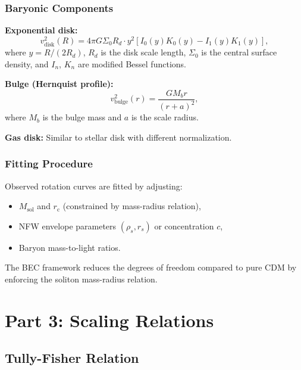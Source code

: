 \documentclass[11pt,a4paper]{article}
\newcommand{\Msol}{\ensuremath{M_{\mathrm{sol}}}}
\newcommand{\rc}{\ensuremath{r_{\mathrm{c}}}}
\theoremstyle{definition}
\theoremstyle{remark}
\begin{document}
\subsubsection{Baryonic Components}

\textbf{Exponential disk:}
\begin{equation}
v_{\mathrm{disk}}^2(R) = 4\pi G \Sigma_0 R_d \cdot y^2 [I_0(y)K_0(y) - I_1(y)K_1(y)],
\end{equation}
where $y = R/(2R_d)$, $R_d$ is the disk scale length, $\Sigma_0$ is the central surface density, and $I_n$, $K_n$ are modified Bessel functions.

\textbf{Bulge (Hernquist profile):}
\begin{equation}
v_{\mathrm{bulge}}^2(r) = \frac{G M_b r}{(r + a)^2},
\end{equation}
where $M_b$ is the bulge mass and $a$ is the scale radius.

\textbf{Gas disk:} Similar to stellar disk with different normalization.

\subsubsection{Fitting Procedure}

Observed rotation curves are fitted by adjusting:
\begin{itemize}
    \item $\Msol$ and $\rc$ (constrained by mass-radius relation),
    \item NFW envelope parameters $(\rho_s, r_s)$ or concentration $c$,
    \item Baryon mass-to-light ratios.
\end{itemize}

The BEC framework reduces the degrees of freedom compared to pure CDM by enforcing the soliton mass-radius relation.

\section{Part 3: Scaling Relations}
\label{sec:scaling}

\subsection{Tully-Fisher Relation}
\label{sec:tully_fisher}
\end{document}
